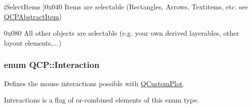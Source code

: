 \begin{Desc}
\begin{description}
{i\+Select\+Items\hypertarget{namespace_q_c_p_a2ad6bb6281c7c2d593d4277b44c2b037a271679ebb13ab4a6b4c2c2d9459f1de8}{}\label{namespace_q_c_p_a2ad6bb6281c7c2d593d4277b44c2b037a271679ebb13ab4a6b4c2c2d9459f1de8}
}]{\ttfamily 0x040} Items are selectable (Rectangles, Arrows, Textitems, etc. see \hyperlink{class_q_c_p_abstract_item}{Q\+C\+P\+Abstract\+Item}) \item[{\em 
i\+Select\+Other\hypertarget{namespace_q_c_p_a2ad6bb6281c7c2d593d4277b44c2b037a2ba96f62595bc22603da0e575b589a83}{}\label{namespace_q_c_p_a2ad6bb6281c7c2d593d4277b44c2b037a2ba96f62595bc22603da0e575b589a83}
}]{\ttfamily 0x080} All other objects are selectable (e.\+g. your own derived layerables, other layout elements,...) \end{description}
\end{Desc}
\subsubsection[{\texorpdfstring{Interaction}{Interaction}}]{\setlength{\rightskip}{0pt plus 5cm}enum {\bf Q\+C\+P\+::\+Interaction}}\hypertarget{namespace_q_c_p_a2ad6bb6281c7c2d593d4277b44c2b037}{}\label{namespace_q_c_p_a2ad6bb6281c7c2d593d4277b44c2b037}
Defines the mouse interactions possible with \hyperlink{class_q_custom_plot}{Q\+Custom\+Plot}.

{\ttfamily Interactions} is a flag of or-\/combined elements of this enum type.

